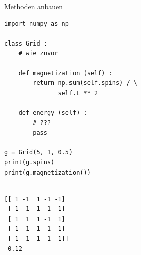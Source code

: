 
\begin{frame}[fragile]{Methoden anbauen}
%
\begin{tcbraster}[raster columns=2,
                  raster equal height,
                  nobeforeafter,
                  raster column skip=0.5cm]
\begin{codebox}
\begin{verbatim}
import numpy as np

class Grid :
    # wie zuvor
    
    def magnetization (self) :
        return np.sum(self.spins) / \
               self.L ** 2
    
    def energy (self) :
        # ???
        pass

g = Grid(5, 1, 0.5)
print(g.spins)
print(g.magnetization())
\end{verbatim}
\end{codebox}
%
\begin{cmdbox}[Ausgabe]
\begin{verbatim}

[[ 1 -1  1 -1 -1]
 [-1  1  1 -1 -1]
 [ 1  1  1 -1  1]
 [ 1  1 -1 -1  1]
 [-1 -1 -1 -1 -1]]
-0.12
\end{verbatim}
\end{cmdbox}
\end{tcbraster}
%
\end{frame}


